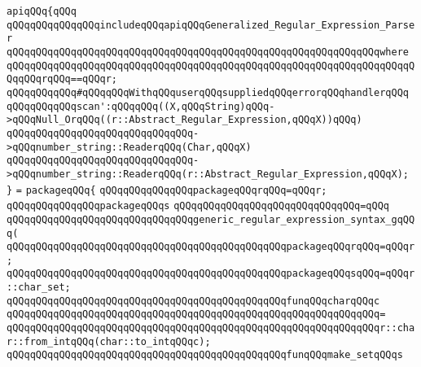 \verb|apiqQQq{qQQq|\newline
\verb|qQQqqQQqqQQqqQQqincludeqQQqapiqQQqGeneralized_Regular_Expression_Parser|\newline
\verb|qQQqqQQqqQQqqQQqqQQqqQQqqQQqqQQqqQQqqQQqqQQqqQQqqQQqqQQqqQQqqQQqwhere|\newline
\verb|qQQqqQQqqQQqqQQqqQQqqQQqqQQqqQQqqQQqqQQqqQQqqQQqqQQqqQQqqQQqqQQqqQQqqQQqqQQqrqQQq==qQQqr;|\newline
\newline
\verb|qQQqqQQqqQQq#qQQqqQQqWithqQQquserqQQqsuppliedqQQqerrorqQQqhandlerqQQq|\newline
\verb|qQQqqQQqqQQqscan':qQQqqQQq((X,qQQqString)qQQq->qQQqNull_OrqQQq((r::Abstract_Regular_Expression,qQQqX))qQQq)|\newline
\verb|qQQqqQQqqQQqqQQqqQQqqQQqqQQqqQQq->qQQqnumber_string::ReaderqQQq(Char,qQQqX)|\newline
\verb|qQQqqQQqqQQqqQQqqQQqqQQqqQQqqQQq->qQQqnumber_string::ReaderqQQq(r::Abstract_Regular_Expression,qQQqX);|\newline
\verb|}|\newline
\verb|=|\newline
\verb|packageqQQq{|\newline
\verb|qQQqqQQqqQQqqQQqpackageqQQqrqQQq=qQQqr;|\newline
\newline
\verb|qQQqqQQqqQQqqQQqpackageqQQqs|\newline
\verb|qQQqqQQqqQQqqQQqqQQqqQQqqQQqqQQq=qQQq|\newline
\verb|qQQqqQQqqQQqqQQqqQQqqQQqqQQqqQQqgeneric_regular_expression_syntax_gqQQq(|\newline
\newline
\verb|qQQqqQQqqQQqqQQqqQQqqQQqqQQqqQQqqQQqqQQqqQQqqQQqpackageqQQqrqQQq=qQQqr;|\newline
\verb|qQQqqQQqqQQqqQQqqQQqqQQqqQQqqQQqqQQqqQQqqQQqqQQqpackageqQQqsqQQq=qQQqr::char_set;|\newline
\newline
\verb|qQQqqQQqqQQqqQQqqQQqqQQqqQQqqQQqqQQqqQQqqQQqqQQqfunqQQqcharqQQqc|\newline
\verb|qQQqqQQqqQQqqQQqqQQqqQQqqQQqqQQqqQQqqQQqqQQqqQQqqQQqqQQqqQQqqQQq=|\newline
\verb|qQQqqQQqqQQqqQQqqQQqqQQqqQQqqQQqqQQqqQQqqQQqqQQqqQQqqQQqqQQqqQQqr::char::from_intqQQq(char::to_intqQQqc);|\newline
\newline
\verb|qQQqqQQqqQQqqQQqqQQqqQQqqQQqqQQqqQQqqQQqqQQqqQQqfunqQQqmake_setqQQqs|\newline
